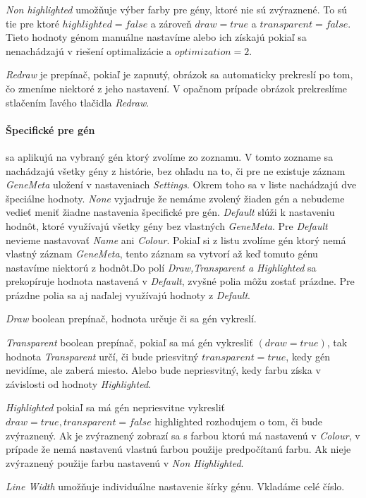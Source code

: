 \emph{Non highlighted} umožňuje výber farby pre gény, ktoré nie sú zvýraznené.
To sú tie pre ktoré $highlighted=false$ a zároveň $draw=true$ a $transparent=false$. Tieto hodnoty génom manuálne nastavíme
alebo ich získajú pokiaľ sa nenachádzajú v riešení optimalizácie a $optimization=2$.

\emph{Redraw} je prepínač, pokiaľ je zapnutý, obrázok sa automaticky prekreslí po tom, čo zmeníme niektoré z jeho nastavení. 
V opačnom prípade obrázok prekreslíme stlačením ľavého tlačidla \emph{Redraw}.
\paragraph{Špecifické pre gén} sa aplikujú na vybraný gén ktorý zvolíme zo zoznamu.
V tomto zozname sa nachádzajú všetky gény z histórie, bez ohľadu na to, či pre ne existuje záznam \emph{GeneMeta} uložení v nastaveniach
\emph{Settings}.
Okrem toho sa v liste nachádzajú dve špeciálne hodnoty. \emph{None} vyjadruje že nemáme zvolený žiaden gén a nebudeme vedieť meniť žiadne 
nastavenia špecifické pre gén. \emph{Default} slúži k nastaveniu hodnôt, ktoré využívajú všetky gény bez vlastných \emph{GeneMeta}.
Pre \emph{Default} nevieme nastavovať \emph{Name} ani \emph{Colour}.
Pokiaľ si z listu zvolíme gén ktorý nemá vlastný záznam \emph{GeneMeta}, tento záznam sa vytvorí až keď tomuto génu nastavíme niektorú z
hodnôt.Do polí \emph{Draw,Transparent a Highlighted} sa prekopíruje hodnota nastavená v \emph{Default}, zvyšné polia môžu zostať prázdne.
Pre prázdne polia sa aj naďalej využívajú hodnoty z \emph{Default}.

\emph{Draw} boolean prepínač, hodnota určuje či sa gén vykreslí.

\emph{Transparent} boolean prepínač, pokiaľ sa má gén vykresliť $(draw=true)$, tak hodnota \emph{Transparent} určí, či bude priesvitný $transparent=true$, kedy gén nevidíme, ale zaberá miesto.
Alebo bude nepriesvitný, kedy farbu získa v závislosti od hodnoty \emph{Highlighted}.

\emph{Highlighted} pokiaľ sa má gén nepriesvitne vykresliť $draw=true,transparent=false$ highlighted rozhodujem o tom, či bude zvýraznený.
Ak je zvýraznený zobrazí sa s farbou ktorú má nastavenú v \emph{Colour}, v prípade že nemá nastavenú vlastnú farbou použije predpočítanú farbu.
Ak nieje zvýraznený použije farbu nastavenú v \emph{Non Highlighted}. 

\emph{Line Width} umožňuje individuálne nastavenie šírky génu. Vkladáme celé číslo.

